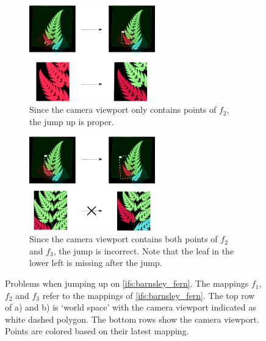 \documentclass[11pt]{article}
\begin{document}
\begin{enumerate}
\begin{figure}
     \centering
     \begin{subfigure}[b]{\textwidth}
         \centering
         \includegraphics[width=0.6\textwidth]{figures/barnsley_colored_jump1}
         \caption{Since the camera viewport only contains points of $f_2$, the jump up is proper.}
         \label{figure:barnsley_jump_a}
         \vspace*{5mm}
     \end{subfigure}
     \begin{subfigure}[b]{\textwidth}
         \centering
         \includegraphics[width=0.6\textwidth]{figures/barnsley_colored_jump2}
         \caption{Since the camera viewport contains both points of $f_2$ and $f_3$, the jump is incorrect. 
Note that the leaf in the lower left is missing after the jump.}
         \label{figure:barnsley_jump_b}
     \end{subfigure}
        \caption{Problems when jumping up on \autoref{ifs:barnsley_fern}. 
The mappings $f_1$, $f_2$ and $f_3$ refer to the mappings of \autoref{ifs:barnsley_fern}. 
The top row of a) and b) is `world space' with the camera viewport indicated as white dashed polygon. 
The bottom rows show the camera viewport.
Points are colored based on their latest mapping. }
        \label{figure:barnsley_jump}
\end{figure}


\end{enumerate}
\end{document}
